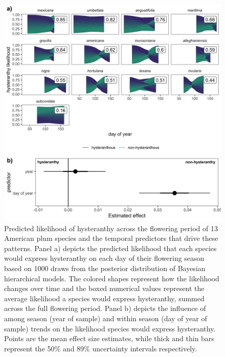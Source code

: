 \documentclass{article}[12pt]
\begin{document}
{{\begin{figure}[h!]
    \centering
 \includegraphics[width=\textwidth]{..//..//Plots/whatReviwerswant/sps_preds.jpeg}  %
    \caption{Predicted likelihood of hysteranthy across the flowering period of 13 American plum species and the temporal predictors that drive these patterns. Panel a) depicts the predicted likelihood that each species would express hysteranthy on each day of their flowering season based on 1000 draws from the posterior distribution of Bayesian hierarchical models. The colored shapes represent how the likelihood changes over time and the boxed numerical values represent the average likelihood a species would express hysteranthy, summed across the full flowering period. %
    Panel b) depicts the influence of among season (year of sample) and within season (day of year of sample) trends on the likelihood species would express hysteranthy. Points are the mean effect size estimates, while thick and thin bars represent the 50\% and 89\% uncertainty intervals respectively.} 
    


\end{figure}}}
\end{document}
